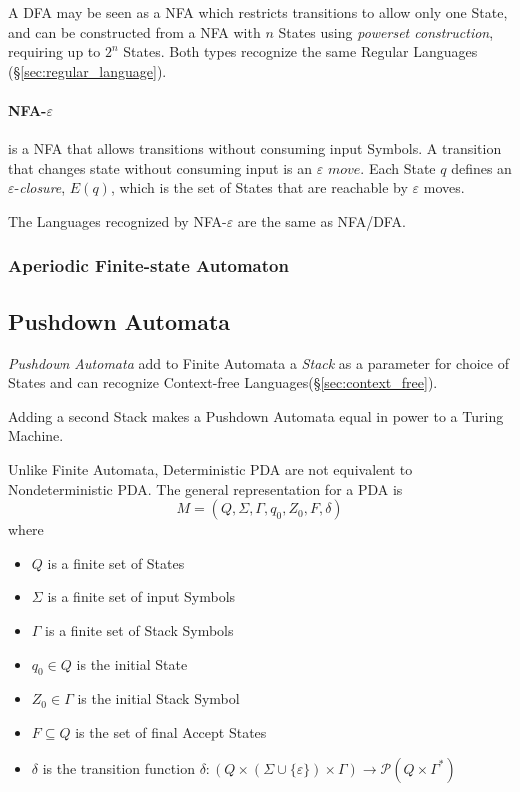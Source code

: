 A DFA may be seen as a NFA which restricts transitions to allow only
one State, and can be constructed from a NFA with $n$ States using
\emph{powerset construction}, requiring up to $2^n$ States. Both types
recognize the same Regular Languages
(\S\ref{sec:regular_language}).

\paragraph{NFA-$\varepsilon$} is a NFA that allows transitions
without consuming input Symbols. A transition that changes state
without consuming input is an $\varepsilon$ $move$. Each State $q$
defines an $\varepsilon$-\emph{closure}, $E(q)$, which is the set of
States that are reachable by $\varepsilon$ moves.

The Languages recognized by NFA-$\varepsilon$ are the same as NFA/DFA.



\subsubsection{Aperiodic Finite-state Automaton}
\label{sec:aperiodic_automaton}



\subsection{Pushdown Automata}\label{sec:pushdown_automata}

\emph{Pushdown Automata} add to Finite Automata a \emph{Stack} as a
parameter for choice of States and can recognize Context-free
Languages(\S\ref{sec:context_free}).

Adding a second Stack makes a Pushdown Automata equal in power to a
Turing Machine.

Unlike Finite Automata, Deterministic PDA are not equivalent to
Nondeterministic PDA. The general representation for a PDA is
\[
    M = (Q, \Sigma, \Gamma, q_0, Z_0, F, \delta)
\]
where
\begin{itemize}
\item $Q$ is a finite set of States
\item $\Sigma$ is a finite set of input Symbols
\item $\Gamma$ is a finite set of Stack Symbols
\item $q_0 \in Q$ is the initial State
\item $Z_0 \in \Gamma$ is the initial Stack Symbol
\item $F \subseteq Q$ is the set of final Accept States
\item $\delta$ is the transition function $\delta: (Q \times (\Sigma
  \cup \{\varepsilon\}) \times \Gamma) \rightarrow \mathcal{P}(Q \times
  \Gamma^*)$
\end{itemize}

